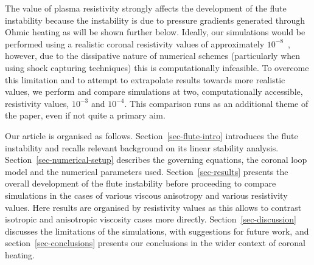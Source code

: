 \documentclass[fleqn,usenatbib]{mnras}
\newcommand{\rev}[1]{{\color{red} {#1}}}
\begin{document}
\rev{The value of plasma resistivity strongly affects the development of
the flute instability because the instability is due to pressure
gradients generated through Ohmic heating as will be shown further below.
Ideally, our simulations would be performed using a realistic coronal
resistivity values of approximately
$10^{-8}$~\citep{craigAnisotropicViscousDissipation2009a}, however, due
to the dissipative nature of numerical schemes (particularly when using shock
capturing techniques) this is computationally infeasible.
To overcome this limitation and to attempt to extrapolate results
towards more realistic values, we perform and compare simulations at 
two, computationally accessible, resistivity values, $10^{-3}$ and
$10^{-4}$. This comparison runs as an additional theme of the paper,
even if not quite a primary aim.}
%

Our article is organised as follows. Section~\ref{sec-flute-intro} introduces
the flute instability and \rev{recalls relevant background on its linear stability analysis}.
Section~\ref{sec-numerical-setup} describes the governing equations,
the coronal loop model and the numerical parameters used. Section~\ref{sec-results}
presents the overall development of the flute instability before
\rev{proceeding to compare simulations in the cases of various viscous
anisotropy and various resistivity values. Here results are
organised by resistivity values as this allows to contrast isotropic
and anisotropic viscosity cases more directly.}
Section~\ref{sec-discussion} discusses the limitations of the simulations, with
suggestions for future work, and section~\ref{sec-conclusions} presents our
conclusions in the wider context of coronal heating.
\end{document}
